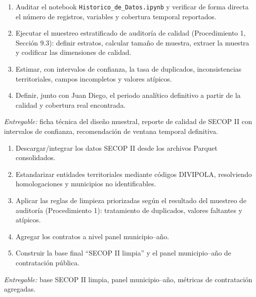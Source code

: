 \documentclass[11pt,letterpaper]{article}
\newenvironment{recuadro}[1]{%
  \begin{tcolorbox}[breakable,colback=boxbg,colframe=ustablue,boxrule=0.6pt,arc=1.5pt,
  title={\small\bfseries #1},fonttitle=\small,coltitle=white,colbacktitle=ustablue,
  left=6pt,right=6pt,top=4pt,bottom=4pt]
}{\end{tcolorbox}}
\begin{document}
\begin{recuadro}{Fase 2 (parte SECOP II) --- Revisión de datos y fuentes}
\begin{enumerate}
\item Auditar el notebook \texttt{Historico\_de\_Datos.ipynb} y verificar de
forma directa el número de registros, variables y cobertura temporal
reportados.
\item Ejecutar el muestreo estratificado de auditoría de calidad
(Procedimiento 1, Sección 9.3): definir estratos, calcular tamaño de muestra,
extraer la muestra y codificar las dimensiones de calidad.
\item Estimar, con intervalos de confianza, la tasa de duplicados,
inconsistencias territoriales, campos incompletos y valores atípicos.
\item Definir, junto con Juan Diego, el periodo analítico definitivo a partir
de la calidad y cobertura real encontrada.
\end{enumerate}
\textit{Entregable:} ficha técnica del diseño muestral, reporte de calidad de
SECOP II con intervalos de confianza, recomendación de ventana temporal
definitiva.
\end{recuadro}

\begin{recuadro}{Fase 3 completa --- Preparación y limpieza de datos}
\begin{enumerate}
\item Descargar/integrar los datos SECOP II desde los archivos Parquet
consolidados.
\item Estandarizar entidades territoriales mediante códigos DIVIPOLA,
resolviendo homologaciones y municipios no identificables.
\item Aplicar las reglas de limpieza priorizadas según el resultado del
muestreo de auditoría (Procedimiento 1): tratamiento de duplicados, valores
faltantes y atípicos.
\item Agregar los contratos a nivel panel municipio--año.
\item Construir la base final ``SECOP II limpia'' y el panel municipio--año de
contratación pública.
\end{enumerate}
\textit{Entregable:} base SECOP II limpia, panel municipio--año, métricas de
contratación agregadas.
\end{recuadro}
\end{document}
